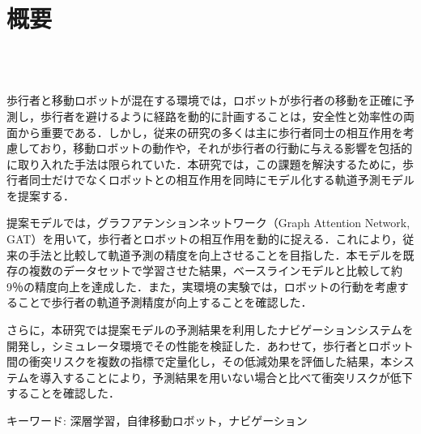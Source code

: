 \chapter*{概要}
\thispagestyle{empty}
%
\begin{center}
  \scalebox{1.5}{移動ロボットのための深層学習を用いた}\\
  \scalebox{1.5}{歩行者の位置予測とナビゲーションへの応用}\\
\end{center}
\vspace{1.0zh}
%

歩行者と移動ロボットが混在する環境では，ロボットが歩行者の移動を正確に予測し，歩行者を避けるように経路を動的に計画することは，安全性と効率性の両面から重要である．しかし，従来の研究の多くは主に歩行者同士の相互作用を考慮しており，移動ロボットの動作や，それが歩行者の行動に与える影響を包括的に取り入れた手法は限られていた．本研究では，この課題を解決するために，歩行者同士だけでなくロボットとの相互作用を同時にモデル化する軌道予測モデルを提案する．

提案モデルでは，グラフアテンションネットワーク（Graph Attention Network, GAT）を用いて，歩行者とロボットの相互作用を動的に捉える．これにより，従来の手法と比較して軌道予測の精度を向上させることを目指した．本モデルを既存の複数のデータセットで学習させた結果，ベースラインモデルと比較して約9％の精度向上を達成した．また，実環境の実験では，ロボットの行動を考慮することで歩行者の軌道予測精度が向上することを確認した．

さらに，本研究では提案モデルの予測結果を利用したナビゲーションシステムを開発し，シミュレータ環境でその性能を検証した．あわせて，歩行者とロボット間の衝突リスクを複数の指標で定量化し，その低減効果を評価した結果，本システムを導入することにより，予測結果を用いない場合と比べて衝突リスクが低下することを確認した．

\begin{flushleft}
キーワード: 深層学習，自律移動ロボット，ナビゲーション
\end{flushleft}
%
\newpage
